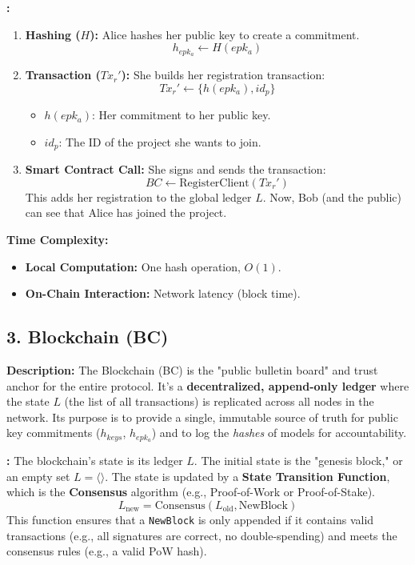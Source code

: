 \documentclass[12pt]{article}
\begin{document}
\textbf{:}
\begin{enumerate}
    \item \textbf{Hashing ($H$):} Alice hashes her public key to create a commitment.
    \[
    h_{epk_a} \leftarrow H(epk_a)
    \]
    \item \textbf{Transaction ($Tx_r'$):} She builds her registration transaction:
    \[
    Tx_r' \leftarrow \{h(epk_a), id_p\}
    \]
    \begin{itemize}
        \item $h(epk_a)$: Her commitment to her public key.
        \item $id_p$: The ID of the project she wants to join.
    \end{itemize}
    \item \textbf{Smart Contract Call:} She signs and sends the transaction:
    \[
    BC \leftarrow \text{RegisterClient}(Tx_r')
    \]
    This adds her registration to the global ledger $L$. Now, Bob (and the public) can see that Alice has joined the project.
\end{enumerate}

\textbf{Time Complexity:}
\begin{itemize}
    \item \textbf{Local Computation:} One hash operation, \textbf{$O(1)$}.
    \item \textbf{On-Chain Interaction:} Network latency (block time).
\end{itemize}

\subsection*{3. Blockchain (BC)}

\textbf{Description:}
The Blockchain (BC) is the "public bulletin board" and trust anchor for the entire protocol. It's a \textbf{decentralized, append-only ledger} where the state $L$ (the list of all transactions) is replicated across all nodes in the network. Its purpose is to provide a single, immutable source of truth for public key commitments ($h_{keys}$, $h_{epk_a}$) and to log the \textit{hashes} of models for accountability.

\textbf{:}
The blockchain's state is its ledger $L$. The initial state is the "genesis block," or an empty set $L = \langle \rangle$. The state is updated by a \textbf{State Transition Function}, which is the \textbf{Consensus} algorithm (e.g., Proof-of-Work or Proof-of-Stake).
\[
L_{\text{new}} = \text{Consensus}(L_{\text{old}}, \text{NewBlock})
\]
This function ensures that a \texttt{NewBlock} is only appended if it contains valid transactions (e.g., all signatures are correct, no double-spending) and meets the consensus rules (e.g., a valid PoW hash).
\end{document}
